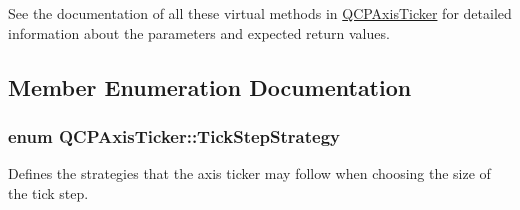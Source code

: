 See the documentation of all these virtual methods in \hyperlink{class_q_c_p_axis_ticker}{Q\+C\+P\+Axis\+Ticker} for detailed information about the parameters and expected return values. 

\subsection{Member Enumeration Documentation}
\subsubsection[{\texorpdfstring{Tick\+Step\+Strategy}{TickStepStrategy}}]{\setlength{\rightskip}{0pt plus 5cm}enum {\bf Q\+C\+P\+Axis\+Ticker\+::\+Tick\+Step\+Strategy}}\hypertarget{class_q_c_p_axis_ticker_ab6d2f9d9477821623ac9bc4b21ddf49a}{}\label{class_q_c_p_axis_ticker_ab6d2f9d9477821623ac9bc4b21ddf49a}
Defines the strategies that the axis ticker may follow when choosing the size of the tick step.

